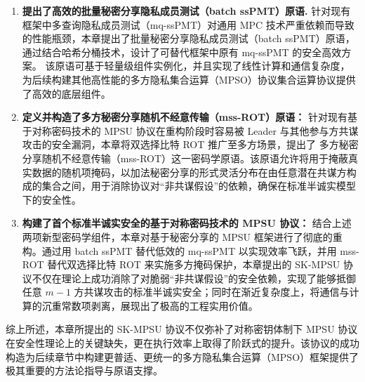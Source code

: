\begin{enumerate}
    \item \textbf{提出了高效的批量秘密分享隐私成员测试（batch ssPMT）原语.}  针对现有框架中多查询隐私成员测试（mq-ssPMT）对通用 MPC 技术严重依赖而导致的性能瓶颈，本章提出了批量秘密分享隐私成员测试（batch ssPMT）原语，通过结合哈希分桶技术，设计了可替代框架中原有 mq-ssPMT 的安全高效方案。
    该原语可基于轻量级组件实例化，并且实现了线性计算和通信复杂度，为后续构建其他高性能的多方隐私集合运算（MPSO）协议集合运算协议提供了高效的底层组件。
    
    \item \textbf{定义并构造了多方秘密分享随机不经意传输（mss-ROT）原语：} 针对现有基于对称密码技术的 MPSU 协议在重构阶段时容易被 Leader 与其他参与方共谋攻击的安全漏洞，本章将双选择比特 ROT 推广至多方场景，提出了 多方秘密分享随机不经意传输（mss-ROT）这一密码学原语。该原语允许将用于掩蔽真实数据的随机项掩码，以加法秘密分享的形式灵活分布在由任意潜在共谋方构成的集合之间，用于消除协议对“非共谋假设”的依赖，确保在标准半诚实模型下的安全性。
    
    \item \textbf{构建了首个标准半诚实安全的基于对称密码技术的 MPSU 协议：} 结合上述两项新型密码学组件，本章对基于秘密分享的 MPSU 框架进行了彻底的重构。通过用 batch ssPMT 替代低效的 mq-ssPMT 以实现效率飞跃，并用 mss-ROT 替代双选择比特 ROT 来实施多方掩码保护，本章提出的 SK-MPSU 协议不仅在理论上成功消除了对脆弱“非共谋假设”的安全依赖，实现了能够抵御任意 $m-1$ 方共谋攻击的标准半诚实安全；同时在渐近复杂度上，将通信与计算的沉重常数项剥离，展现出了极高的工程实用价值。
\end{enumerate}

综上所述，本章所提出的 SK-MPSU 协议不仅弥补了对称密钥体制下 MPSU 协议在安全性理论上的关键缺失，更在执行效率上取得了阶跃式的提升。该协议的成功构造为后续章节中构建更普适、更统一的多方隐私集合运算（MPSO）框架提供了极其重要的方法论指导与原语支撑。